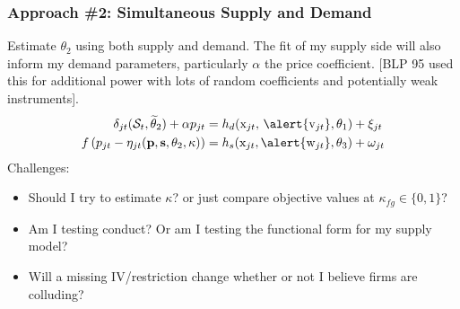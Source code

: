 \begin{frame}
\frametitle{Approach \#2: Simultaneous Supply and Demand}
Estimate $\theta_2$ using both supply and demand. The fit of my supply side will also inform my demand parameters, particularly $\alpha$ the price coefficient. [BLP 95 used this for additional power with lots of random coefficients and potentially weak instruments].
\begin{align*}
\delta_{jt}(\mathcal{S}_t,\widetilde{\theta}_2) + \alpha p_{jt} &= h_d(\textrm{x}_{jt}, \, \alert{\textrm{v}_{jt}},\theta_1)  + \xi_{jt} \\
 f \left( p_{jt} - \eta_{jt}(\mathbf{p},\mathbf{s},\theta_2,\kappa) \right) &= h_s(\textrm{x}_{jt}, \alert{\textrm{w}_{jt}},\theta_3) + \omega_{jt}
\end{align*}
Challenges:
\begin{itemize}
\item Should I try to estimate $\kappa$? or just compare objective values at $\kappa_{fg}\in\{0,1\}$?
\item Am I testing conduct? Or am I testing the functional form for my supply model?
\item Will a missing IV/restriction change whether or not I believe firms are colluding?
\end{itemize}
\end{frame}


